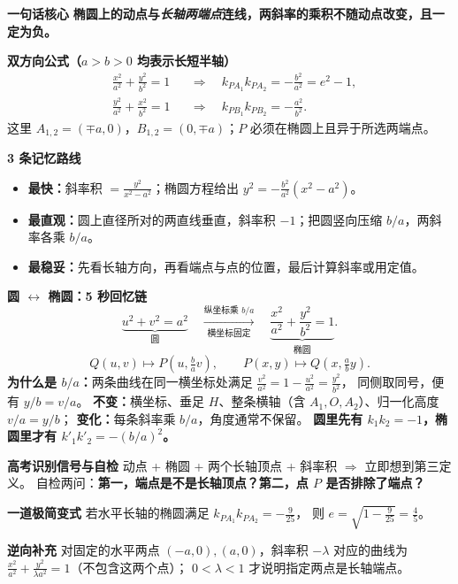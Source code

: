 \begin{summarybox}
\textbf{\textcolor{CSummary}{一句话核心}}
\textbf{椭圆上的动点与\emph{长轴两端点}连线，两斜率的乘积不随动点改变，且一定为负。}

\medskip
\textbf{\textcolor{CSummary}{双方向公式（$a>b>0$ 均表示长短半轴）}}
\[
 \boxed{\begin{aligned}
 &\frac{x^2}{a^2}+\frac{y^2}{b^2}=1
 &&\Longrightarrow\quad k_{PA_1}k_{PA_2}=-\frac{b^2}{a^2}=e^2-1,\\
 &\frac{y^2}{a^2}+\frac{x^2}{b^2}=1
 &&\Longrightarrow\quad k_{PB_1}k_{PB_2}=-\frac{a^2}{b^2}.
 \end{aligned}}
\]
这里 $A_{1,2}=(\mp a,0)$，$B_{1,2}=(0,\mp a)$；$P$ 必须在椭圆上且异于所选两端点。

\medskip
\textbf{\textcolor{CSummary}{3 条记忆路线}}
\begin{itemize}[leftmargin=*,itemsep=0.35em,topsep=0.3em]
 \item \textbf{最快：}斜率积 $=\frac{y^2}{x^2-a^2}$；椭圆方程给出 $y^2=-\frac{b^2}{a^2}(x^2-a^2)$。
 \item \textbf{最直观：}圆上直径所对的两直线垂直，斜率积 $-1$；把圆竖向压缩 $b/a$，两斜率各乘 $b/a$。
 \item \textbf{最稳妥：}先看长轴方向，再看端点与点的位置，最后计算斜率或用定值。
\end{itemize}

\medskip
\textbf{\textcolor{CSummary}{圆 $\longleftrightarrow$ 椭圆：5 秒回忆链}}
\[
 \underbrace{u^2+v^2=a^2}_{\text{圆}}
 \quad\xrightarrow[\text{横坐标固定}]{\text{纵坐标乘 }b/a}\quad
 \underbrace{\frac{x^2}{a^2}+\frac{y^2}{b^2}=1}_{\text{椭圆}}.
\]
\[
 \boxed{Q(u,v)\mapsto P(u,\tfrac ba v)},\qquad
 \boxed{P(x,y)\mapsto Q(x,\tfrac ab y)}.
\]
\textbf{为什么是 $b/a$：}两条曲线在同一横坐标处满足
$\frac{v^2}{a^2}=1-\frac{u^2}{a^2}=\frac{y^2}{b^2}$，
同侧取同号，便有 $y/b=v/a$。
\textbf{不变：}横坐标、垂足 $H$、整条横轴（含 $A_1,O,A_2$）、归一化高度 $v/a=y/b$；
\textbf{变化：}每条斜率乘 $b/a$，角度通常不保留。
\textbf{圆里先有 $k_1k_2=-1$，椭圆里才有 $k'_1k'_2=-(b/a)^2$。}

\medskip
\textbf{\textcolor{CSummary}{高考识别信号与自检}}
动点 + 椭圆 + 两个长轴顶点 + 斜率积 $\Rightarrow$ 立即想到第三定义。
自检两问：\textbf{第一，端点是不是长轴顶点？第二，点 $P$ 是否排除了端点？}

\medskip
\textbf{\textcolor{CSummary}{一道极简变式}}
若水平长轴的椭圆满足 $k_{PA_1}k_{PA_2}=-\frac9{25}$，
则 $e=\sqrt{1-\frac9{25}}=\boxed{\frac45}$。

\medskip
\textbf{\textcolor{CSummary}{逆向补充}}
对固定的水平两点 $(-a,0),(a,0)$，斜率积 $-\lambda$ 对应的曲线为
$\frac{x^2}{a^2}+\frac{y^2}{\lambda a^2}=1$（不包含这两个点）；
$0<\lambda<1$ 才说明指定两点是长轴端点。
\end{summarybox}
